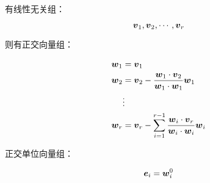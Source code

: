 \documentclass{article}
\begin{document}
有线性无关组：

\[\boldsymbol v_1,\boldsymbol v_2,\cdots,\boldsymbol v_r\]

则有正交向量组：

\[\begin{aligned}
        \boldsymbol w_1 & =\boldsymbol v_1                                                         \\
        \boldsymbol w_2 & =\boldsymbol v_2-\frac{\boldsymbol w_1\cdot\boldsymbol v_2}{\boldsymbol w_1\cdot\boldsymbol w_1}\boldsymbol w_1                 \\
             & \vdots                                                        \\
        \boldsymbol w_r & =\boldsymbol v_r-\sum_{i=1}^{r-1}\frac{\boldsymbol w_i\cdot\boldsymbol v_r}{\boldsymbol w_i\cdot\boldsymbol w_i}\boldsymbol w_i
    \end{aligned}\]

正交单位向量组：

\[\boldsymbol e_i=\boldsymbol w_i^0\]
\end{document}
